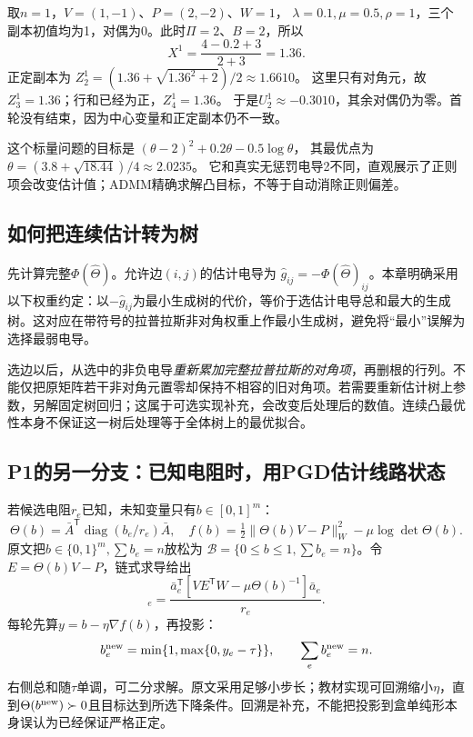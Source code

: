 \begin{example}
取$n=1$，$V=(1,-1)$、$P=(2,-2)$、$W=1$，
$\lambda=0.1,\mu=0.5,\rho=1$，三个副本初值均为1，对偶为0。此时$\Pi=2$、$B=2$，所以
\[
 X^1=\frac{4-0.2+3}{2+3}=1.36.
\]
正定副本为
$Z_2^1=(1.36+\sqrt{1.36^2+2})/2\approx1.6610$。
这里只有对角元，故$Z_3^1=1.36$；行和已经为正，$Z_4^1=1.36$。
于是$U_2^1\approx-0.3010$，其余对偶仍为零。首轮没有结束，因为中心变量和正定副本仍不一致。

这个标量问题的目标是
$(\theta-2)^2+0.2\theta-0.5\log\theta$，
其最优点为
$\theta=(3.8+\sqrt{18.44})/4\approx2.0235$。
它和真实无惩罚电导2不同，直观展示了正则项会改变估计值；ADMM精确求解凸目标，不等于自动消除正则偏差。
\end{example}

\subsection{如何把连续估计转为树}

先计算完整$\Phi(\widehat\Theta)$。允许边$(i,j)$的估计电导为
$\widehat g_{ij}=-\Phi(\widehat\Theta)_{ij}$。本章明确采用以下权重约定：以$-\widehat g_{ij}$为最小生成树的代价，等价于选估计电导总和最大的生成树。这对应在带符号的拉普拉斯非对角权重上作最小生成树，避免将“最小”误解为选择最弱电导。

选边以后，从选中的非负电导\emph{重新累加完整拉普拉斯的对角项}，再删根的行列。不能仅把原矩阵若干非对角元置零却保持不相容的旧对角项。若需要重新估计树上参数，另解固定树回归；这属于可选实现补充，会改变后处理后的数值。连续凸最优性本身不保证这一树后处理等于全体树上的最优拟合。

\subsection{P1的另一分支：已知电阻时，用PGD估计线路状态}

若候选电阻$r_e$已知，未知变量只有$b\in[0,1]^m$：
\[
 \Theta(b)=\bar A^{\mathsf T}\operatorname{diag}(b_e/r_e)\bar A,\quad
 f(b)=\tfrac12\|\Theta(b)V-P\|_W^2-\mu\log\det\Theta(b).
\]
原文把$b\in\{0,1\}^m,\sum b_e=n$放松为
$\mathcal B=\{0\leq b\leq1,\sum b_e=n\}$。令$E=\Theta(b)V-P$，链式求导给出
\begin{equation}
 [\nabla f(b)]_e=
 \frac{\bar a_e^{\mathsf T}
 [VE^{\mathsf T}W-\mu\Theta(b)^{-1}]
 \bar a_e}{r_e}.
 \label{eq:tb-P1-PGD}
\end{equation}
每轮先算$y=b-\eta\nabla f(b)$，再投影：
\[
 b_e^{\rm new}=\min\{1,\max\{0,y_e-\tau\}\},\qquad
 \sum_e b_e^{\rm new}=n.
\]
右侧总和随$\tau$单调，可二分求解。原文采用足够小步长；教材实现可回溯缩小$\eta$，直到$\Theta(b^{\rm new})\succ0$且目标达到所选下降条件。回溯是补充，不能把投影到盒单纯形本身误认为已经保证严格正定。

